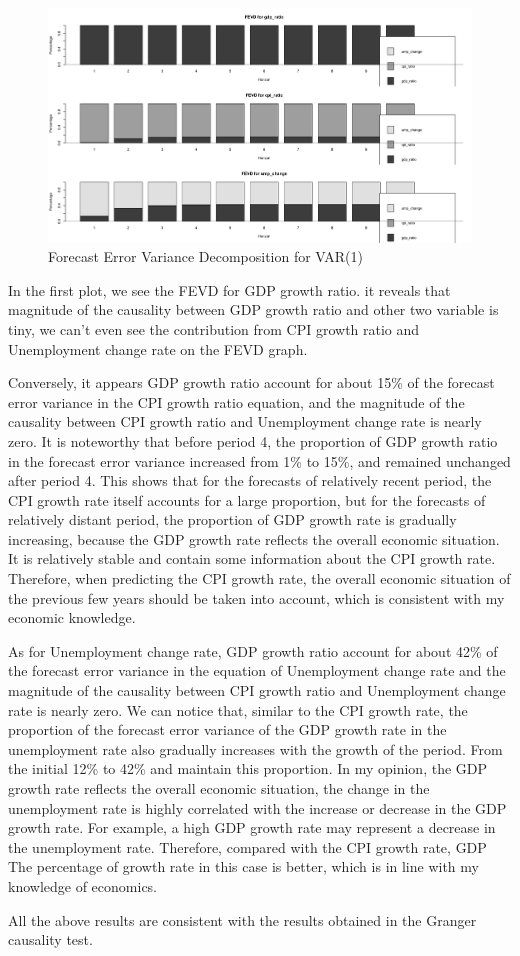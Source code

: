 \documentclass{report}
\begin{document}
\begin{figure}[H] 
\centering
\includegraphics[width=1\textwidth]{fevd} 
\caption{Forecast Error Variance Decomposition for VAR(1)} 
\label{Fig.fevd}
\end{figure}

In the first plot, we see the FEVD for GDP growth ratio. it reveals that magnitude of the causality between GDP growth ratio and other two variable is tiny, we can’t even see the contribution from CPI growth ratio and Unemployment change rate on the FEVD graph.

Conversely, it appears GDP growth ratio account for about 15\% of the forecast error variance in the 
CPI growth ratio equation, and the magnitude of the causality between CPI growth ratio and Unemployment change rate is nearly zero. It is noteworthy that before period 4, the proportion of GDP growth ratio in the forecast error variance increased from 1\% to 15\%, and remained unchanged after period 4.  This shows that for the forecasts of relatively recent period, the CPI growth rate itself accounts for a large proportion, but for the forecasts of relatively distant period, the proportion of GDP growth rate is gradually increasing, because the GDP growth rate reflects the overall economic situation. It is relatively stable and contain some information about the CPI growth rate. Therefore, when predicting the CPI growth rate, the overall economic situation of the previous few years should be taken into account, which is consistent with my economic knowledge.

As for Unemployment change rate, GDP growth ratio account for about 42\% of the forecast error variance in the equation of Unemployment change rate  and the magnitude of the causality between CPI growth ratio and Unemployment change rate is nearly zero. We can notice that, similar to the CPI growth rate, the proportion of the forecast error variance of the GDP growth rate in the unemployment rate also gradually increases with the growth of the period. From the initial 12\% to 42\% and maintain this proportion. In my opinion, the GDP growth rate reflects the overall economic situation, the change in the unemployment rate is highly correlated with the increase or decrease in the GDP growth rate. For example, a high GDP growth rate may represent a decrease in the unemployment rate. Therefore, compared with the CPI growth rate, GDP The percentage of growth rate in this case is better, which is in line with my knowledge of economics.

All the above results are consistent with the results obtained in the Granger causality test.
\end{document}
